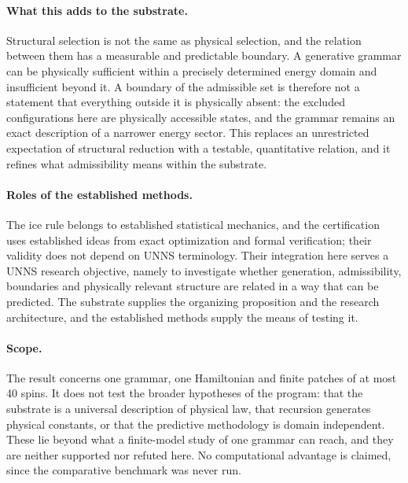 \documentclass[11pt,a4paper]{article}
\theoremstyle{plain}
\theoremstyle{definition}
\theoremstyle{remark}
\begin{document}
\paragraph{What this adds to the substrate.} Structural selection is not the same as physical selection, and the relation between them has a measurable and predictable boundary. A generative grammar can be physically sufficient within a precisely determined energy domain and insufficient beyond it. A boundary of the admissible set is therefore not a statement that everything outside it is physically absent: the excluded configurations here are physically accessible states, and the grammar remains an exact description of a narrower energy sector. This replaces an unrestricted expectation of structural reduction with a testable, quantitative relation, and it refines what admissibility means within the substrate.

\paragraph{Roles of the established methods.} The ice rule belongs to established statistical mechanics, and the certification uses established ideas from exact optimization and formal verification; their validity does not depend on UNNS terminology. Their integration here serves a UNNS research objective, namely to investigate whether generation, admissibility, boundaries and physically relevant structure are related in a way that can be predicted. The substrate supplies the organizing proposition and the research architecture, and the established methods supply the means of testing it.

\paragraph{Scope.} The result concerns one grammar, one Hamiltonian and finite patches of at most 40 spins. It does not test the broader hypotheses of the program: that the substrate is a universal description of physical law, that recursion generates physical constants, or that the predictive methodology is domain independent. These lie beyond what a finite-model study of one grammar can reach, and they are neither supported nor refuted here. No computational advantage is claimed, since the comparative benchmark was never run.
\end{document}
